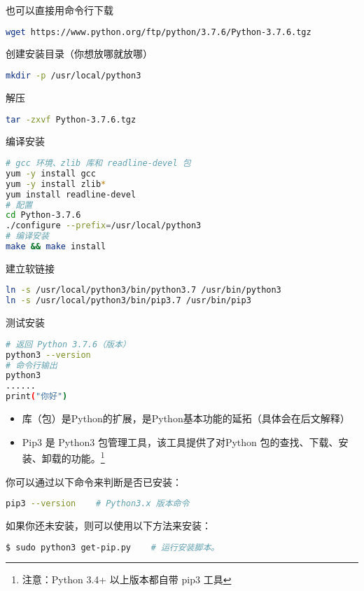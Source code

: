 也可以直接用命令行下载
\begin{lstlisting}[language=bash]
wget https://www.python.org/ftp/python/3.7.6/Python-3.7.6.tgz
\end{lstlisting}

创建安装目录（你想放哪就放哪）
\begin{lstlisting}[language=bash]
mkdir -p /usr/local/python3
\end{lstlisting}

解压
\begin{lstlisting}[language=bash]
tar -zxvf Python-3.7.6.tgz
\end{lstlisting}

编译安装
\begin{lstlisting}[language=bash]
# gcc 环境、zlib 库和 readline-devel 包
yum -y install gcc
yum -y install zlib*
yum install readline-devel
# 配置
cd Python-3.7.6
./configure --prefix=/usr/local/python3
# 编译安装
make && make install
\end{lstlisting}

建立软链接
\begin{lstlisting}[language=bash]
ln -s /usr/local/python3/bin/python3.7 /usr/bin/python3
ln -s /usr/local/python3/bin/pip3.7 /usr/bin/pip3
\end{lstlisting}

测试安装
\begin{lstlisting}[language=bash]
# 返回 Python 3.7.6（版本）
python3 --version
# 命令行输出
python3
......
print("你好")
\end{lstlisting}

\begin{itemize}
\item 库（包）是Python的扩展，是Python基本功能的延拓（具体会在后文解释）
\item Pip3 是 Python3 包管理工具，该工具提供了对Python 包的查找、下载、安装、卸载的功能。\footnote{注意：Python 3.4+ 以上版本都自带 pip3 工具}
\end{itemize}

你可以通过以下命令来判断是否已安装：


\begin{lstlisting}[language=bash]
pip3 --version    # Python3.x 版本命令
\end{lstlisting}

如果你还未安装，则可以使用以下方法来安装：

\begin{lstlisting}[language=bash]
$ sudo python3 get-pip.py    # 运行安装脚本。
\end{lstlisting}





